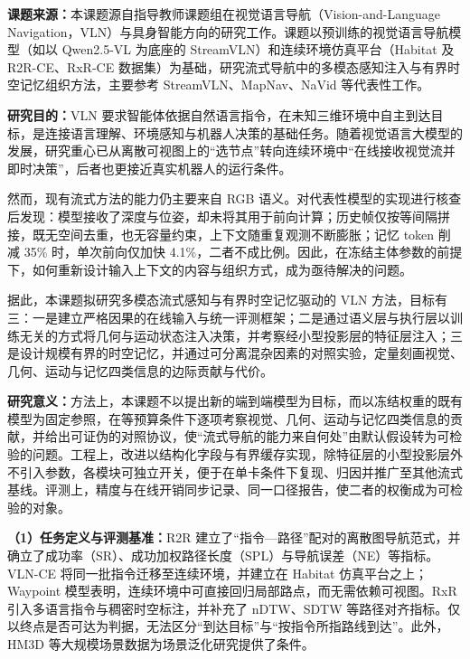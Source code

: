 \renewcommand{\thefigure}{\arabic{figure}}
\renewcommand{\thetable}{\arabic{table}}



\textbf{课题来源：}本课题源自指导教师课题组在视觉语言导航（Vision-and-Language Navigation，VLN）与具身智能方向的研究工作。课题以预训练的视觉语言导航模型（如以 Qwen2.5-VL 为底座的 StreamVLN）和连续环境仿真平台（Habitat 及 R2R-CE、RxR-CE 数据集）为基础，研究流式导航中的多模态感知注入与有界时空记忆组织方法，主要参考 StreamVLN、MapNav、NaVid 等代表性工作。

\textbf{研究目的：}VLN 要求智能体依据自然语言指令，在未知三维环境中自主到达目标，是连接语言理解、环境感知与机器人决策的基础任务\cite{anderson2018vln}。随着视觉语言大模型的发展，研究重心已从离散可视图上的“选节点”转向连续环境中“在线接收视觉流并即时决策”，后者也更接近真实机器人的运行条件\cite{krantz2020vlnce,zhang2024navid}。

然而，现有流式方法的能力仍主要来自 RGB 语义。对代表性模型的实现进行核查后发现：模型接收了深度与位姿，却未将其用于前向计算；历史帧仅按等间隔拼接，既无空间去重，也无容量约束，上下文随重复观测不断膨胀；记忆 token 削减 35\% 时，单次前向仅加快 4.1\%，二者不成比例。因此，在冻结主体参数的前提下，如何重新设计输入上下文的内容与组织方式，成为亟待解决的问题。

据此，本课题拟研究多模态流式感知与有界时空记忆驱动的 VLN 方法，目标有三：一是建立严格因果的在线输入与统一评测框架；二是通过语义层与执行层以训练无关的方式将几何与运动状态注入决策，并考察经小型投影层的特征层注入；三是设计规模有界的时空记忆，并通过可分离混杂因素的对照实验，定量刻画视觉、几何、运动与记忆四类信息的边际贡献与代价。

\textbf{研究意义：}方法上，本课题不以提出新的端到端模型为目标，而以冻结权重的既有模型为固定参照，在等预算条件下逐项考察视觉、几何、运动与记忆四类信息的贡献，并给出可证伪的对照协议，使“流式导航的能力来自何处”由默认假设转为可检验的问题。工程上，改进以结构化字段与有界缓存实现，除特征层的小型投影层外不引入参数，各模块可独立开关，便于在单卡条件下复现、归因并推广至其他流式基线。评测上，精度与在线开销同步记录、同一口径报告，使二者的权衡成为可检验的对象。


\textbf{（1）任务定义与评测基准：}R2R 建立了“指令—路径”配对的离散图导航范式，并确立了成功率（SR）、成功加权路径长度（SPL）与导航误差（NE）等指标\cite{anderson2018vln}。VLN-CE 将同一批指令迁移至连续环境，并建立在 Habitat 仿真平台之上\cite{krantz2020vlnce,savva2019habitat}；Waypoint 模型表明，连续环境中可直接回归局部路点，而无需依赖可视图\cite{krantz2021waypoint}。RxR 引入多语言指令与稠密时空标注，并补充了 nDTW、SDTW 等路径对齐指标\cite{ku2020rxr,ilharco2019ndtw}。仅以终点是否可达为判据，无法区分“到达目标”与“按指令所指路线到达”。此外，HM3D 等大规模场景数据为场景泛化研究提供了条件\cite{ramakrishnan2021hm3d}。

